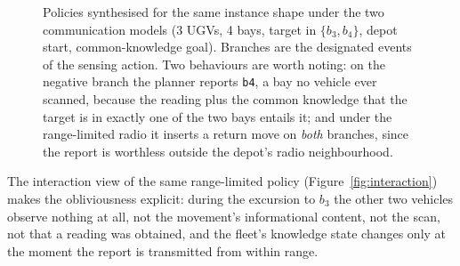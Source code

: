 \documentclass[11pt,a4paper]{article}
\theoremstyle{definition}
\newcommand{\Ag}{\mathcal{A}}
\newcommand{\Kw}[1]{\mathit{Kw}_{#1}}
\newcommand{\Cop}[1]{C_{#1}}
\begin{document}
\begin{figure}[H]
\caption{Policies synthesised for the same instance shape under the two
communication models (3 UGVs, 4 bays, target in $\{b_3,b_4\}$, depot start,
common-knowledge goal). Branches are the designated events of the sensing
action. Two behaviours are worth noting: on the negative branch the planner
reports \texttt{b4}, a bay no vehicle ever scanned, because the reading plus
the common knowledge that the target is in exactly one of the two bays entails
it; and under the range-limited radio it inserts a return move on \emph{both}
branches, since the report is worthless outside the depot's radio
neighbourhood.}
\label{fig:policies}
\end{figure}

The interaction view of the same range-limited policy
(Figure~\ref{fig:interaction}) makes the obliviousness explicit: during the
excursion to $b_3$ the other two vehicles observe nothing at all, not the
movement's informational content, not the scan, not that a reading was
obtained, and the fleet's knowledge state changes only at the moment the
report is transmitted from within range.
\end{document}
